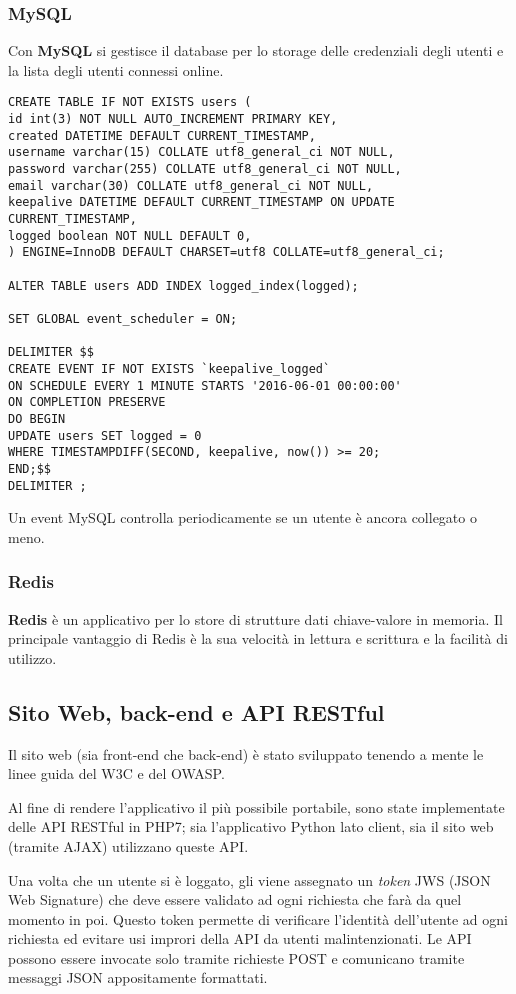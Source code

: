 \subsubsection{MySQL}
Con \textbf{MySQL} si gestisce il database per lo storage delle credenziali degli utenti e la lista degli utenti connessi online.
\begin{lstlisting}[frame=none]
CREATE TABLE IF NOT EXISTS users (
id int(3) NOT NULL AUTO_INCREMENT PRIMARY KEY,
created DATETIME DEFAULT CURRENT_TIMESTAMP,
username varchar(15) COLLATE utf8_general_ci NOT NULL,
password varchar(255) COLLATE utf8_general_ci NOT NULL,
email varchar(30) COLLATE utf8_general_ci NOT NULL,
keepalive DATETIME DEFAULT CURRENT_TIMESTAMP ON UPDATE CURRENT_TIMESTAMP,
logged boolean NOT NULL DEFAULT 0,
) ENGINE=InnoDB DEFAULT CHARSET=utf8 COLLATE=utf8_general_ci;

ALTER TABLE users ADD INDEX logged_index(logged);

SET GLOBAL event_scheduler = ON;

DELIMITER $$
CREATE EVENT IF NOT EXISTS `keepalive_logged`
ON SCHEDULE EVERY 1 MINUTE STARTS '2016-06-01 00:00:00'
ON COMPLETION PRESERVE
DO BEGIN
UPDATE users SET logged = 0
WHERE TIMESTAMPDIFF(SECOND, keepalive, now()) >= 20;
END;$$
DELIMITER ;
\end{lstlisting}
Un event MySQL controlla periodicamente se un utente è ancora collegato o meno.

\subsubsection{Redis}
\textbf{Redis} è un applicativo per lo store di strutture dati chiave-valore in memoria. Il principale vantaggio di Redis è la sua velocità in lettura e scrittura e la facilità di utilizzo.

\subsection{Sito Web, back-end e API RESTful}
Il sito web (sia front-end che back-end) è stato sviluppato tenendo a mente le linee guida del W3C e del OWASP.

Al fine di rendere l'applicativo il più possibile portabile, sono state implementate delle API RESTful in PHP7; sia l'applicativo Python lato client, sia il sito web (tramite AJAX) utilizzano queste API.

Una volta che un utente si è loggato, gli viene assegnato un \textit{token} JWS (JSON Web Signature) che deve essere validato ad ogni richiesta che farà da quel momento in poi. Questo token permette di verificare l'identità dell'utente ad ogni richiesta ed evitare usi improri della API da utenti malintenzionati.
Le API possono essere invocate solo tramite richieste POST e comunicano tramite messaggi JSON appositamente formattati.

